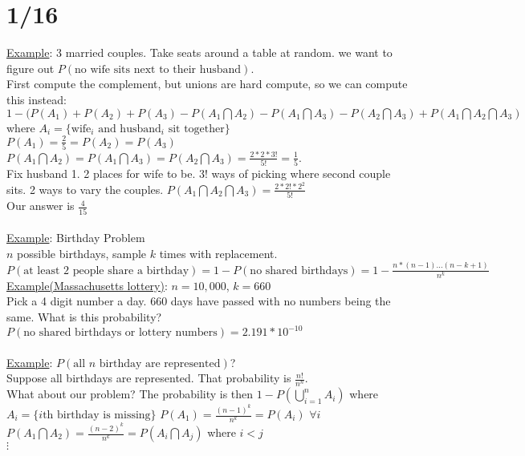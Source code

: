 \section*{1/16}
  \underline{Example}: 3 married couples. Take seats around a table at random.
  we want to figure out $P(\text{no wife sits next to their husband})$.\\
  First compute the complement, but unions are hard compute, so we can compute
  this instead:
  $1 - (P(A_1) + P(A_2) + P(A_3) - P(A_1 \bigcap A_2) - P(A_1 \bigcap A_3) - 
  P(A_2 \bigcap A_3) + P(A_1 \bigcap A_2 \bigcap A_3)$ where $A_i = \{ 
  \text{wife$_i$ and husband$_i$ sit together}\}$\\
  $P(A_1) = \frac{2}{5} = P(A_2) = P(A_3)$\\
  $P(A_1 \bigcap A_2) = P(A_1 \bigcap A_3) = P(A_2 \bigcap A_3) = \frac{2 * 2 * 3!}{5!} = \frac{1}{5}$.\\
  Fix husband 1. 2 places for wife to be. 3! ways of picking where second couple
  sits. 2 ways to vary the couples.
  $P(A_1 \bigcap A_2 \bigcap A_3) = \frac{2 * 2! * 2^2}{5!}$\\
  Our answer is $\frac{4}{15}$\\\\
  \underline{Example}: Birthday Problem\\
  $n$ possible birthdays, sample $k$ times with replacement.\\
  $P(\text{at least 2 people share a birthday}) = 1 - 
  P(\text{no shared birthdays}) = 1 - \frac{n*(n-1)\ldots (n-k+1)}{n^k}$\\
  \underline{Example(Massachusetts lottery)}: $n = 10,000$, $k = 660$\\
  Pick a 4 digit number a day. 660 days have passed with no numbers being
  the same. What is this probability?
  $P(\text{no shared birthdays or lottery numbers}) = 2.191 * 10^{-10}$\\\\
  \underline{Example}: $P(\text{all $n$ birthday are represented})$?\\
  Suppose all birthdays are represented. That probability is $\frac{n!}{n^n}$.\\
  What about our problem? The probability is then $1 - 
  P(\bigcup_{i=1}^n A_i)$ where $A_i = \{\text{$i$th birthday is missing}\}$
  $P(A_1) = \frac{(n-1)^k}{n^k} = P(A_i)$ $\forall i$\\
  $P(A_1 \bigcap A_2) = \frac{(n-2)^k}{n^k} = P(A_i \bigcap A_j)$ where $i < 
  j$\\
  $\vdots$\\
